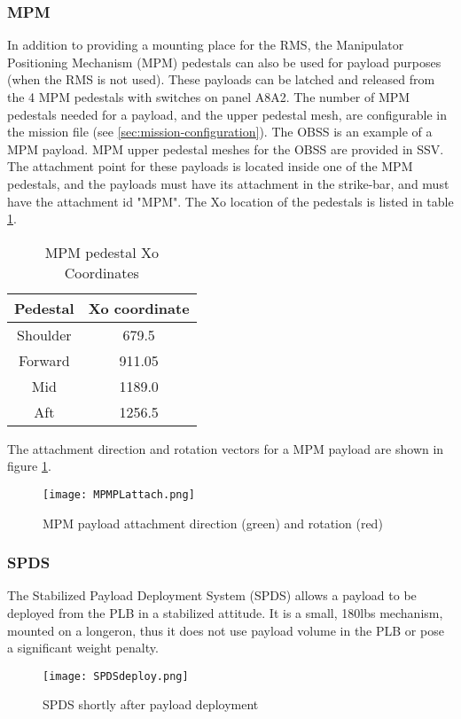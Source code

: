 \documentclass[Space_Shuttle_Vessel_Manual.tex]{subfiles}
\begin{document}
\begin{multicols*}{2}
\subsubsection{MPM}
In addition to providing a mounting place for the RMS, the Manipulator Positioning Mechanism (MPM) pedestals can also be used for payload purposes (when the RMS is not used). These payloads can be latched and released from the 4 MPM pedestals with switches on panel A8A2.
The number of MPM pedestals needed for a payload, and the upper pedestal mesh, are configurable in the mission file (see \ref{sec:mission-configuration}). The OBSS is an example of a MPM payload. MPM upper pedestal meshes for the OBSS are provided in SSV.\\
The attachment point for these payloads is located inside one of the MPM pedestals, and the payloads must have its attachment in the strike-bar, and must have the attachment id "MPM". The Xo location of the pedestals is listed in table \ref{tab:MPMCoordinates}.

\begin{table}[H]
  \centering
  \begin{tabularx}{125pt}{c | c}
    \textbf{Pedestal} & \textbf{Xo coordinate} \\
    \hline
    Shoulder & 679.5 \\
    Forward & 911.05 \\
    Mid & 1189.0 \\
    Aft & 1256.5
  \end{tabularx}
  \caption{MPM pedestal Xo Coordinates}
  \label{tab:MPMCoordinates}
\end{table}

\noindent
The attachment direction and rotation vectors for a MPM payload are shown in figure \ref{fig:MPMPLattach}.
\begin{figure}[H]
  \centering
  \captionsetup{justification=centering}
  \texttt{[image: MPMPLattach.png]}
  \caption{MPM payload attachment direction (green) and rotation (red)}
  \label{fig:MPMPLattach}
\end{figure}


\subsubsection{SPDS}
The Stabilized Payload Deployment System (SPDS) allows a payload to be deployed from the PLB in a stabilized attitude. It is a small, 180lbs mechanism, mounted on a longeron, thus it does not use payload volume in the PLB or pose a significant weight penalty.
\\
\begin{figure}[H]
  \centering
  \captionsetup{justification=centering}
  \texttt{[image: SPDSdeploy.png]}%
  \caption{SPDS shortly after payload deployment}
  \label{fig:SPDSdeploy}
\end{figure}


\end{multicols*}
\end{document}

